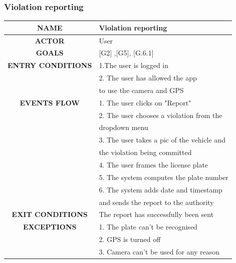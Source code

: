 \documentclass[12pt,a4paper]{article}
\begin{document}
\subsubsection{Violation reporting}
		\begin{center}
			\begin{tabular}{| c | l |}
				\hline
				\textbf{NAME} & Violation reporting \\
				\hline
				\textbf{ACTOR} & User \\
				\hline
				\textbf{GOALS} & [G2] ,[G5], [G.6.1] \\
				\hline
				\textbf{ENTRY CONDITIONS} &1.The user is logged in \\
				&2. The user has allowed the app \\
				&to use the camera and GPS \\ \hline
				\textbf{EVENTS FLOW}  &
				1. The user clicks on "Report"\\
				&2. The user chooses a violation from the \\
				& dropdown menu \\
				&3. The user takes a pic of the vehicle and \\
				& the violation being committed \\ \hline
				&4. The user frames the license plate\\
				&5. The system computes the plate number \\
				&6. The system adds date and timestamp \\
				& and sends the report to the authority \\ 
				\hline
				\textbf{EXIT CONDITIONS}  & The report has successfully been sent \\ \hline
				\textbf{EXCEPTIONS} &
				1. The plate can't be recognised \\
				&2. GPS is turned off\\
				&3. Camera can't be used for any reason\\
				\hline
			\end{tabular}
		\end{center}
\end{document}
